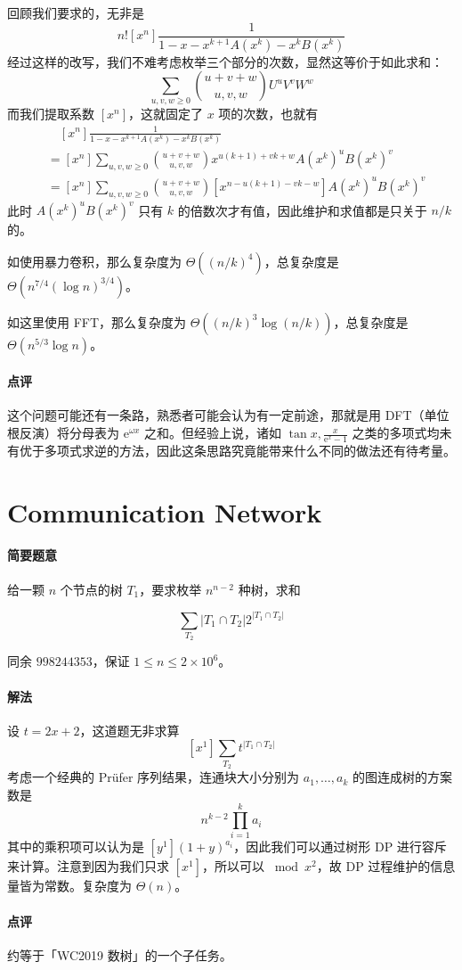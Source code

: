 \documentclass[12pt]{ctexart}
\theoremstyle{theorem}
\theoremstyle{theorem}
\begin{document}
回顾我们要求的，无非是
$$
n![x^n] \frac 1{1-x-x^{k+1}A(x^k)-x^kB(x^k)}
$$
经过这样的改写，我们不难考虑枚举三个部分的次数，显然这等价于如此求和：
$$
\sum_{u,v,w\ge 0} \binom{u+v+w}{u,v,w} U^uV^vW^w 
$$
而我们提取系数 $[x^n]$，这就固定了 $x$ 项的次数，也就有
\begin{align*}
&\quad [x^n] \frac 1{1-x-x^{k+1}A(x^k)-x^kB(x^k)}\\
&= [x^n]\sum_{u,v,w\ge 0} \binom{u+v+w}{u,v,w}x^{u(k+1)+vk+w}A(x^k)^uB(x^k)^v\\
&= [x^n]\sum_{u,v,w\ge 0} \binom{u+v+w}{u,v,w} [x^{n-u(k+1)-vk-w}] A(x^k)^uB(x^k)^v
\end{align*}
此时 $A(x^k)^uB(x^k)^v$ 只有 $k$ 的倍数次才有值，因此维护和求值都是只关于 $n/k$ 的。

如使用暴力卷积，那么复杂度为 $\Theta((n/k)^4)$，总复杂度是 $\Theta(n^{7/4}(\log n)^{3/4})$。

如这里使用 FFT，那么复杂度为 $\Theta((n/k)^3\log (n/k))$，总复杂度是 $\Theta(n^{5/3}\log n)$。

\paragraph{点评} 这个问题可能还有一条路，熟悉者可能会认为有一定前途，那就是用 DFT（单位根反演）将分母表为 $\mathrm{e}^{\omega x}$ 之和。但经验上说，诸如 $\tan x, \frac x{\mathrm e^x-1}$ 之类的多项式均未有优于多项式求逆的方法，因此这条思路究竟能带来什么不同的做法还有待考量。

\newpage

\section{Communication Network}

\paragraph{简要题意}

给一颗 $n$ 个节点的树 $T_1$，要求枚举 $n^{n-2}$ 种树，求和

$$
\sum_{T_2} |T_1 \cap T_2|2^{|T_1 \cap T_2|}
$$

同余 $998244353$，保证 $1\le n\le 2\times 10^6$。

\paragraph{解法}

设 $t=2x+2$，这道题无非求算
$$
[x^1] \sum_{T_2} t^{|T_1 \cap T_2|}
$$
考虑一个经典的 Pr\"ufer 序列结果，连通块大小分别为 $a_1,\dots,a_k$ 的图连成树的方案数是
$$
n^{k-2}\prod_{i=1}^k a_i
$$
其中的乘积项可以认为是 $[y^1](1+y)^{a_i}$，因此我们可以通过树形 DP 进行容斥来计算。注意到因为我们只求 $[x^1]$，所以可以 $\bmod x^2$，故 DP 过程维护的信息量皆为常数。复杂度为 $\Theta(n)$。

\paragraph{点评} 约等于「WC2019 数树」的一个子任务。
\end{document}

